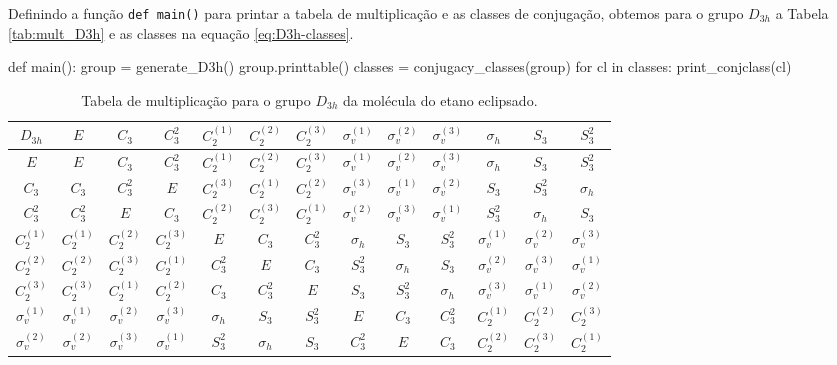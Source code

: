 \documentclass[a4paper,10pt]{article}
\newcommand{\python}[1]{\texttt{#1}}
\begin{document}
Definindo a função \python{def main()} para printar a tabela de multiplicação e as classes de conjugação, obtemos para o grupo $D_{3h}$ a Tabela \ref{tab:mult_D3h} e as classes na equação \ref{eq:D3h-classes}.
\begin{Python}
def main():
    group = generate_D3h()
    group.printtable()
    classes = conjugacy_classes(group)
    for cl in classes:
        print_conjclass(cl)
\end{Python}

\begin{table}[ht]
\caption{Tabela de multiplicação para o grupo $D_{3h}$ da molécula do etano eclipsado.}
\centering

\begin{tabular} { |c|c c c c c c c c c c c c | }
\hline
$D_{3h}$ & $E$ & $C_3$ & $C_3^2$ & $C_2^{(1)}$ & $C_2^{(2)}$ & $C_2^{(3)}$ & $\sigma_v^{(1)}$ & $\sigma_v^{(2)}$ & $\sigma_v^{(3)}$ & $\sigma_h$ & $S_3$ & $S_3^2$ \\
\hline
$E$ & $E$ & $C_3$ & $C_3^2$ & $C_2^{(1)}$ & $C_2^{(2)}$ & $C_2^{(3)}$ & $\sigma_v^{(1)}$ & $\sigma_v^{(2)}$ & $\sigma_v^{(3)}$ & $\sigma_h$ & $S_3$ & $S_3^2$ \\
$C_3$ & $C_3$ & $C_3^2$ & $E$ & $C_2^{(3)}$ & $C_2^{(1)}$ & $C_2^{(2)}$ & $\sigma_v^{(3)}$ & $\sigma_v^{(1)}$ & $\sigma_v^{(2)}$ & $S_3$ & $S_3^2$ & $\sigma_h$ \\
$C_3^2$ & $C_3^2$ & $E$ & $C_3$ & $C_2^{(2)}$ & $C_2^{(3)}$ & $C_2^{(1)}$ & $\sigma_v^{(2)}$ & $\sigma_v^{(3)}$ & $\sigma_v^{(1)}$ & $S_3^2$ & $\sigma_h$ & $S_3$ \\
$C_2^{(1)}$ & $C_2^{(1)}$ & $C_2^{(2)}$ & $C_2^{(3)}$ & $E$ & $C_3$ & $C_3^2$ & $\sigma_h$ & $S_3$ & $S_3^2$ & $\sigma_v^{(1)}$ & $\sigma_v^{(2)}$ & $\sigma_v^{(3)}$ \\
$C_2^{(2)}$ & $C_2^{(2)}$ & $C_2^{(3)}$ & $C_2^{(1)}$ & $C_3^2$ & $E$ & $C_3$ & $S_3^2$ & $\sigma_h$ & $S_3$ & $\sigma_v^{(2)}$ & $\sigma_v^{(3)}$ & $\sigma_v^{(1)}$ \\
$C_2^{(3)}$ & $C_2^{(3)}$ & $C_2^{(1)}$ & $C_2^{(2)}$ & $C_3$ & $C_3^2$ & $E$ & $S_3$ & $S_3^2$ & $\sigma_h$ & $\sigma_v^{(3)}$ & $\sigma_v^{(1)}$ & $\sigma_v^{(2)}$ \\
$\sigma_v^{(1)}$ & $\sigma_v^{(1)}$ & $\sigma_v^{(2)}$ & $\sigma_v^{(3)}$ & $\sigma_h$ & $S_3$ & $S_3^2$ & $E$ & $C_3$ & $C_3^2$ & $C_2^{(1)}$ & $C_2^{(2)}$ & $C_2^{(3)}$ \\
$\sigma_v^{(2)}$ & $\sigma_v^{(2)}$ & $\sigma_v^{(3)}$ & $\sigma_v^{(1)}$ & $S_3^2$ & $\sigma_h$ & $S_3$ & $C_3^2$ & $E$ & $C_3$ & $C_2^{(2)}$ & $C_2^{(3)}$ & $C_2^{(1)}$ \\

\end{tabular}
\end{table}
\end{document}
